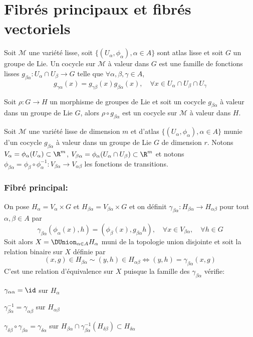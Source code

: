 \newpage
\section{Fibrés principaux et fibrés vectoriels}

\begin{defi}[Cocycle]
Soit $\mathcal{M}$ une variété lisse, soit $\{(U_\alpha, \phi_\alpha), \alpha \in A\}$ sont atlas lisse et soit $G$ un groupe de Lie. Un cocycle sur $\mathcal{M}$ à valeur dans $G$ est une famille de fonctions lisses $g_{\beta\alpha} : U_\alpha \cap U_\beta \to G$ telle que $\forall \alpha, \beta, \gamma \in A$,
$$g_{\gamma\alpha}(x) = g_{\gamma\beta}(x)g_{\beta\alpha}(x), \quad \forall x \in U_\alpha \cap U_\beta \cap U_\gamma$$ 
\end{defi}

\begin{pro}
Soit $\rho : G \to H$ un morphisme de groupes de Lie et soit un cocycle $g_{\beta\alpha}$ à valeur dans un groupe de Lie $G$, alors $\rho \circ g_{\beta\alpha}$ est un cocycle sur $\mathcal{M}$ à valeur dans $H$. \\
\end{pro}

Soit $\mathcal{M}$ une variété lisse de dimension $m$ et d'atlas $\{(U_\alpha, \phi_\alpha), \alpha \in A\}$ munie d'un cocycle $g_{\beta\alpha}$ à valeur dans un groupe de Lie $G$ de dimension $r$. Notons $V_\alpha = \phi_\alpha(U_\alpha) \subset \R^m$, $V_{\beta\alpha} = \phi_\alpha(U_\alpha \cap U_\beta) \subset \R^m$ et notons $\phi_{\beta\alpha} = \phi_\beta \circ \phi_\alpha^{-1} : V_{\beta\alpha} \to V_{\alpha\beta}$ les fonctions de transitions.

\subsubsection{Fibré principal:}

On pose $H_\alpha = V_\alpha\times G$ et $H_{\beta\alpha} = V_{\beta\alpha}\times G$ et on définit $\gamma_{\beta\alpha} : H_{\beta\alpha} \to H_{\alpha\beta}$ pour tout $\alpha, \beta \in A$ par
$$\gamma_{\beta\alpha}(\phi_\alpha(x), h) = (\phi_\beta(x), g_{\beta\alpha}h), \quad \forall x\in V_{\beta\alpha}, \quad \forall h\in G$$
Soit alors $X = \DUnion_{\alpha \in A} H_\alpha$ muni de la topologie union disjointe et soit la relation binaire sur $X$ définie par
$$(x, g) \in H_{\beta\alpha} \sim (y, h) \in H_{\alpha\beta} \iff (y,h) = \gamma_{\beta\alpha}(x,g)$$
C'est une relation d'équivalence sur $X$ puisque la famille des $\gamma_{\beta\alpha}$ vérifie:
\be
	\item $\gamma_{\alpha\alpha} = \id$ sur $H_\alpha$
	\item $\gamma_{\beta\alpha}^{-1} = \gamma_{\alpha\beta}$ sur $H_{\alpha\beta}$
	\item $\gamma_{\delta\beta} \circ \gamma_{\beta\alpha} = \gamma_{\delta\alpha}$ sur $H_{\beta\alpha} \cap \gamma_{\beta\alpha}^{-1}(H_{\delta\beta}) \subset H_{\delta\alpha}$ \\
\ee

